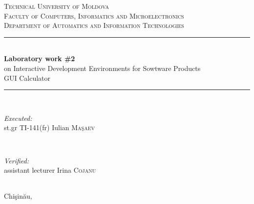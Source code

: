 \documentclass[12pt]{article}
\begin{document}
\begin{titlepage}

\newcommand{\HRule}{\rule{\linewidth}{0.5mm}} 

\center 
 

\textsc{\LARGE Technical University of Moldova}\\[0.8cm] 
\textsc{\Large Faculty of Computers, Informatics and Microelectronics}\\[0.5cm] 
\textsc{\large Department of Automatics and Information Technologies}\\[5.2cm] 


\HRule \\[0.4cm]
{ \huge \bfseries Laboratory work \#2}\\[0.3cm]
{\large on Interactive Development Environments for Sowtware Products}\\
{\large GUI Calculator}\\[0.4cm] 
\HRule \\[5.5cm]
 

\begin{minipage}{0.4\textwidth}
\begin{flushleft} \large
\emph{Executed:}\\
st.gr TI-141(fr) Iulian \textsc{Ma\c{s}aev} 
\end{flushleft}
\end{minipage}
~
\begin{minipage}{0.4\textwidth}
\begin{flushright} \large
\emph{Verified:} \\
assistant lecturer Irina \textsc{Cojanu} 
\end{flushright}
\end{minipage}\\[4cm]


\vfill 
{\large Chi\c{s}in\u{a}u, \the\year}\\[3cm] 



\end{titlepage}



\end{document}
